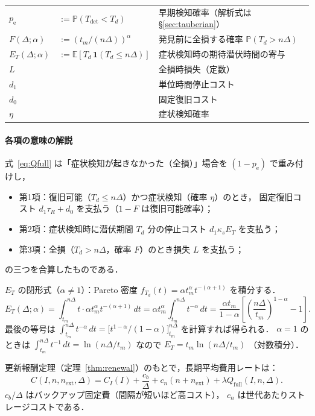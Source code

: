 \documentclass[12pt,a4paper]{article}
\theoremstyle{plain}
\theoremstyle{definition}
\theoremstyle{remark}
\newcommand{\E}{\mathbb{E}}
\newcommand{\Prob}{\mathbb{P}}
\newcommand{\pe}{p_{\mathrm{e}}}
\newcommand{\Qf}{Q_{\mathrm{full}}}
\newcommand{\Tdet}{T_{\mathrm{det}}}
\begin{document}
\medskip
\begin{tabular}{@{}ll p{88mm}@{}}
$\pe$ & $:=\Prob(\Tdet<T_d)$ & 早期検知確率（解析式は \S\ref{sec:tauberian}）\\
$F(\Delta;\alpha)$ & $:=(t_m/(n\Delta))^\alpha$ & 発見前に全損する確率 $\Prob(T_d>n\Delta)$ \\
$E_T(\Delta;\alpha)$ & $:=\E[T_d\,\mathbf{1}(T_d\le n\Delta)]$ & 症状検知時の期待潜伏時間の寄与 \\
$L$ & & 全損時損失（定数）\\
$d_1$ & & 単位時間停止コスト\\
$d_0$ & & 固定復旧コスト\\
$\eta$ & & 症状検知確率\\
\end{tabular}
\medskip

\paragraph{各項の意味の解説}
式~\eqref{eq:Qfull} は「症状検知が起きなかった（全損）」場合を $(1-\pe)$ で重み付けし，
\begin{itemize}[leftmargin=2em]
\item 第1項：復旧可能（$T_d\le n\Delta$）かつ症状検知（確率 $\eta$）のとき，
  固定復旧コスト $d_1\tau_R+d_0$ を支払う（$1-F$ は復旧可能確率）；
\item 第2項：症状検知時に潜伏期間 $T_d$ 分の停止コスト $d_1\kappa_s E_T$ を支払う；
\item 第3項：全損（$T_d>n\Delta$，確率 $F$）のとき損失 $L$ を支払う；
\end{itemize}
の三つを合算したものである．

\medskip
$E_T$ の閉形式（$\alpha\ne1$）：Pareto 密度 $f_{T_d}(t)=\alpha t_m^\alpha t^{-(\alpha+1)}$ を積分する．
\begin{equation}\label{eq:ET}
E_T(\Delta;\alpha)
=\int_{t_m}^{n\Delta} t\cdot\alpha t_m^\alpha t^{-(\alpha+1)}\,dt
=\alpha t_m^\alpha\int_{t_m}^{n\Delta}t^{-\alpha}\,dt
=\frac{\alpha t_m}{1-\alpha}\!\left[\!\left(\frac{n\Delta}{t_m}\right)^{\!1-\alpha}\!-1\right].
\end{equation}
最後の等号は $\int_{t_m}^{n\Delta}t^{-\alpha}\,dt=\bigl[t^{1-\alpha}/(1-\alpha)\bigr]_{t_m}^{n\Delta}$
を計算すれば得られる．
$\alpha=1$ のときは $\int_{t_m}^{n\Delta}t^{-1}\,dt=\ln(n\Delta/t_m)$ なので
$E_T=t_m\ln(n\Delta/t_m)$ （対数積分）．

更新報酬定理（定理~\ref{thm:renewal}）のもとで，長期平均費用レートは：
\begin{equation}\label{eq:cost_rate}
C(I,n,n_{\mathrm{ext}},\Delta)
= C_I(I)+\frac{c_b}{\Delta}+c_n(n+n_{\mathrm{ext}})+\lambda\Qf(I,n,\Delta).
\end{equation}
$c_b/\Delta$ はバックアップ固定費（間隔が短いほど高コスト），
$c_n$ は世代あたりストレージコストである．
\end{document}
